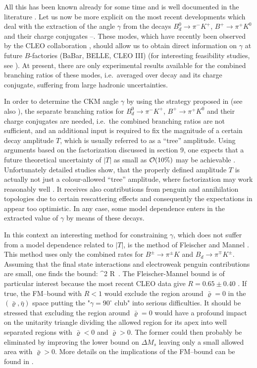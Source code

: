 All this has been known already for some time and is well documented
in the literature \cite{BF97,RF97}. Let us now be more explicit on
the most recent developments which deal with the extraction of
the angle $\gamma$ from the decays $B^0_d\to\pi^-K^+$, 
$B^+\to\pi^+K^0$ and their charge conjugates  
\cite{PAPIII}--\cite{defan}. These modes, which have recently been observed 
by the CLEO collaboration \cite{cleo}, should allow us to obtain direct 
information on $\gamma$ at future $B$-factories (BaBar, 
BELLE, CLEO III) (for interesting feasibility studies, see 
\cite{groro,wuegai,babar}). At present, there are only experimental results 
available for the combined branching ratios of these modes, i.e.\ averaged 
over decay and its charge conjugate, suffering from large hadronic
uncertainties. 

In order to determine the CKM angle $\gamma$ by using the strategy proposed
in \cite{PAPIII} (see also \cite{groro}), the separate branching ratios 
for $B^0_d\to\pi^-K^+$, $B^+\to\pi^+K^0$ and their charge conjugates are 
needed, i.e.\ the combined branching ratios are not sufficient, and an 
additional input is required to fix the magnitude of a certain decay 
amplitude $T$, which is usually referred to as a ``tree'' amplitude. Using 
arguments based on the factorization discussed in section 9, one expects 
that a future theoretical 
uncertainty of $|T|$ as small as ${\cal O}(10\%)$ may be achievable 
\cite{groro,wuegai}. Unfortunately detailed studies show, that the properly 
defined 
amplitude $T$ is actually not just a colour-allowed ``tree'' amplitude, 
where factorization may work reasonably well \cite{bjorken}. 
It receives also contributions from penguin and annihilation topologies 
due to certain rescattering effects \cite{defan,bfm} and consequently
the expectations in \cite{groro,wuegai}
appear too optimistic. In any case, some model dependence enters in the 
extracted value of $\gamma$ by means of these decays.

In this context
an interesting method for constraining $\gamma$,
which  
does not suffer from a model 
dependence related to $|T|$, is the method of 
Fleischer and Mannel \cite{fm2}. 
This method
uses only the combined rates for $B^{\pm}\to\pi^{\pm}K$ and 
$B_d\to\pi^{\mp}K^{\pm}$.
Assuming that the final state interactions and electroweak penguin 
contributions are small,
one finds  the bound:
\be\label{FMBOUND}
\sin^2\gamma \le 
{}\equiv R~.
\ee
The Fleischer-Mannel bound is of particular interest because the most 
recent CLEO data give $R=0.65\pm 0.40$ \cite{cleo}.
If true,
the FM--bound with $R<1$
would exclude the region around $\bar\varrho=0$ in the 
$(\bar\varrho,\bar\eta)$ space  putting 
the "$\gamma=90^\circ$ club" \cite{BjSt} into serious difficulties. It
should be stressed that excluding the region around $\bar\varrho=0$
would have a profound impact on the unitarity triangle dividing the
allowed region for its apex into well separated regions with
$\bar\varrho<0$ and $\bar\varrho>0$. The former could then probably
be eliminated by improving the lower bound on $\Delta M_s$ leaving
only a small allowed area with $\bar\varrho>0$. 
More details on
the implications of the FM--bound can be found in 
\cite{fm2,GNF,FRENCH}.

